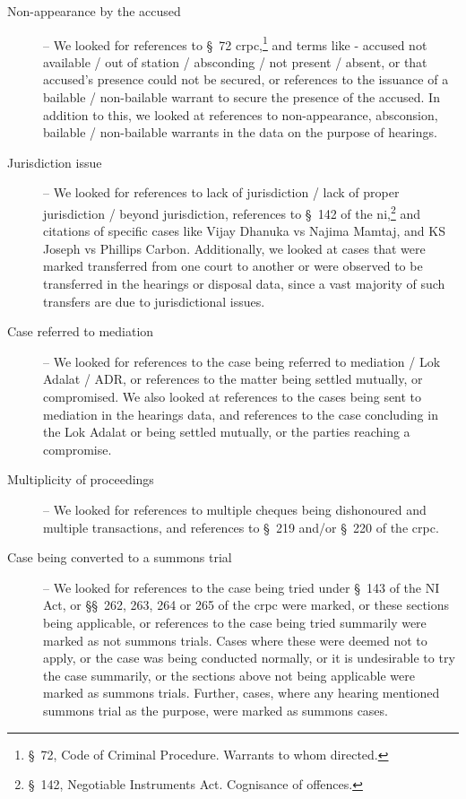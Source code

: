 \begin{description}
\item [Non-appearance by the accused] -- We looked for references to \S~72 \gls{crpc},\footnote{\S~72, Code of Criminal Procedure. Warrants to whom directed.} and terms like - accused not available / out of station / absconding / not present / absent, or that accused’s presence could not be secured, or references to the issuance of a bailable / non-bailable warrant to secure the presence of the accused. In addition to this, we looked at references to non-appearance, absconsion, bailable / non-bailable warrants in the data on the purpose of hearings.

\item[]

\item [Jurisdiction issue] -- We looked for references to lack of jurisdiction / lack of proper jurisdiction / beyond jurisdiction, references to \S~142 of the \gls{ni},\footnote{\S~142, Negotiable Instruments Act. Cognisance of offences.} and citations of specific cases like Vijay Dhanuka vs Najima Mamtaj, and KS Joseph vs Phillips Carbon. Additionally, we looked at cases that were marked transferred from one court to another or were observed to be transferred in the hearings or disposal data, since a vast majority of such transfers are due to jurisdictional issues.

\item[]

\item [Case referred to mediation] -- We looked for references to the case being referred to mediation / Lok Adalat / ADR, or references to the matter being settled mutually, or compromised. We also looked at references to the cases being sent to mediation in the hearings data, and references to the case concluding in the Lok Adalat or being settled mutually, or the parties reaching a compromise.

\item[]

\item [Multiplicity of proceedings] -- We looked for references to multiple cheques being dishonoured and multiple transactions, and references to \S~219 and/or \S~220 of the \gls{crpc}.

\item[]

\item [Case being converted to a summons trial] -- We looked for references to the case being tried under \S~143 of the NI Act, or \S\S~262, 263, 264 or 265 of the \gls{crpc} were marked, or these sections being applicable, or references to the case being tried summarily were marked as not summons trials. Cases where these were deemed not to apply, or the case was being conducted normally, or it is undesirable to try the case summarily, or the sections above not being applicable were marked as summons trials. Further, cases, where any hearing mentioned summons trial as the purpose, were marked as summons cases.

\end{description}

